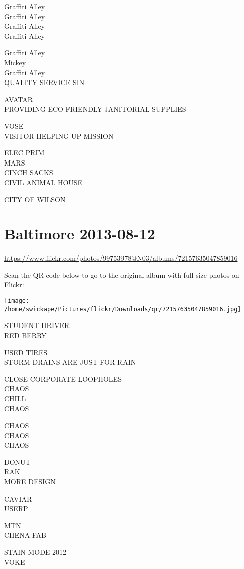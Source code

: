 \documentclass[10pt,letterpaper]{article}
\begin{document}
Graffiti Alley\\
Graffiti Alley\\
Graffiti Alley\\
Graffiti Alley

Graffiti Alley\\
Mickey\\
Graffiti Alley\\
QUALITY SERVICE SIN

AVATAR\\
PROVIDING ECO{-}FRIENDLY JANITORIAL SUPPLIES

VOSE\\
VISITOR HELPING UP MISSION

ELEC PRIM\\
MARS\\
CINCH SACKS\\
CIVIL ANIMAL HOUSE

CITY OF WILSON
\pagebreak

\section*{Baltimore 2013-08-12}

\url{https://www.flickr.com/photos/99753978@N03/albums/72157635047859016}

Scan the QR code below to go to the original album with full-size photos on Flickr:

\texttt{[image: /home/swickape/Pictures/flickr/Downloads/qr/72157635047859016.jpg]}
\pagebreak

STUDENT DRIVER\\
RED BERRY

USED TIRES\\
STORM DRAINS ARE JUST FOR RAIN

CLOSE CORPORATE LOOPHOLES\\
CHAOS\\
CHILL\\
CHAOS

CHAOS\\
CHAOS\\
CHAOS

DONUT\\
RAK\\
MORE DESIGN

CAVIAR\\
USERP

MTN\\
CHENA FAB

STAIN MODE 2012\\
VOKE
\end{document}
